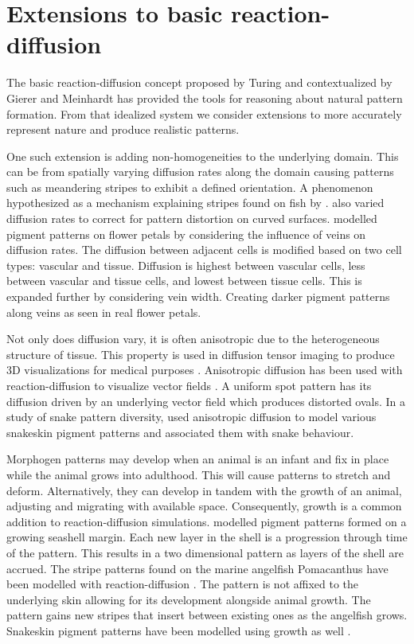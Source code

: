 \section{Extensions to basic reaction-diffusion}
The basic reaction-diffusion concept proposed by Turing and contextualized by Gierer and Meinhardt has provided the tools for reasoning about natural pattern formation. From that idealized system we consider extensions to more accurately represent nature and produce realistic patterns.

One such extension is adding non-homogeneities to the underlying domain. This can be from spatially varying diffusion rates along the domain causing patterns such as meandering stripes to exhibit a defined orientation. A phenomenon hypothesized as a mechanism explaining stripes found on fish by \citet{zheng2009}. \citet{Witkin1991} also varied diffusion rates to correct for pattern distortion on curved surfaces. \citet{Zhou2007} modelled pigment patterns on flower petals by considering the influence of veins on diffusion rates. The diffusion between adjacent cells is modified based on two cell types: vascular and tissue. Diffusion is highest between vascular cells, less between vascular and tissue cells, and lowest between tissue cells. This is expanded further by considering vein width. Creating darker pigment patterns along veins as seen in real flower petals.

Not only does diffusion vary, it is often anisotropic due to the heterogeneous structure of tissue. This property is used in diffusion tensor imaging to produce 3D visualizations for medical purposes \citep{Bihan2001}. Anisotropic diffusion has been used with reaction-diffusion to visualize vector fields \citep{Sanderson2004}. A uniform spot pattern has its diffusion driven by an underlying vector field which produces distorted ovals. In a study of snake pattern diversity, \citet{Allen2013} used anisotropic diffusion to model various snakeskin pigment patterns and associated them with snake behaviour.

Morphogen patterns may develop when an animal is an infant and fix in place while the animal grows into adulthood. This will cause patterns to stretch and deform. Alternatively, they can develop in tandem with the growth of an animal, adjusting and migrating with available space. Consequently, growth is a common addition to reaction-diffusion simulations. \citet{fowler1992modeling} modelled pigment patterns formed on a growing seashell margin. Each new layer in the shell is a progression through time of the pattern. This results in a two dimensional pattern as layers of the shell are accrued. The stripe patterns found on the marine angelfish Pomacanthus have been modelled with reaction-diffusion \citep{Kondo1995}. The pattern is not affixed to the underlying skin allowing for its development alongside animal growth. The pattern gains new stripes that insert between existing ones as the angelfish grows. Snakeskin pigment patterns have been modelled using growth as well \citep{MURRAY1991}.

